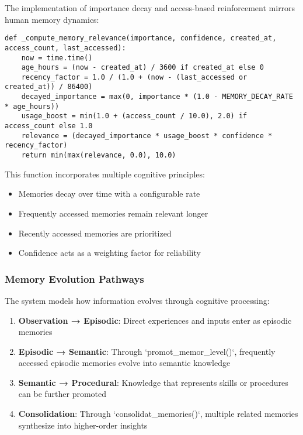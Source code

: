 \documentclass[12pt,a4paper]{article}
\begin{document}
The implementation of importance decay and access-based reinforcement mirrors human memory dynamics:
\begin{pageablecode}
\begin{verbatim}
def _compute_memory_relevance(importance, confidence, created_at, access_count, last_accessed):
    now = time.time()
    age_hours = (now - created_at) / 3600 if created_at else 0
    recency_factor = 1.0 / (1.0 + (now - (last_accessed or created_at)) / 86400)
    decayed_importance = max(0, importance * (1.0 - MEMORY_DECAY_RATE * age_hours))
    usage_boost = min(1.0 + (access_count / 10.0), 2.0) if access_count else 1.0
    relevance = (decayed_importance * usage_boost * confidence * recency_factor)
    return min(max(relevance, 0.0), 10.0)
\end{verbatim}
\end{pageablecode}
This function incorporates multiple cognitive principles:
\begin{itemize}
    \item Memories decay over time with a configurable rate
    \item Frequently accessed memories remain relevant longer
    \item Recently accessed memories are prioritized
    \item Confidence acts as a weighting factor for reliability
\end{itemize}

\subsubsection*{Memory Evolution Pathways}

The system models how information evolves through cognitive processing:

\begin{enumerate}[label=\arabic*.]
    \item \textbf{Observation → Episodic}: Direct experiences and inputs enter as episodic memories
    \item \textbf{Episodic → Semantic}: Through `promot\1\_memor\1\_level()`, frequently accessed episodic memories evolve into semantic knowledge
    \item \textbf{Semantic → Procedural}: Knowledge that represents skills or procedures can be further promoted
    \item \textbf{Consolidation}: Through `consolidat\1\_memories()`, multiple related memories synthesize into higher-order insights
\end{enumerate}
\end{document}
